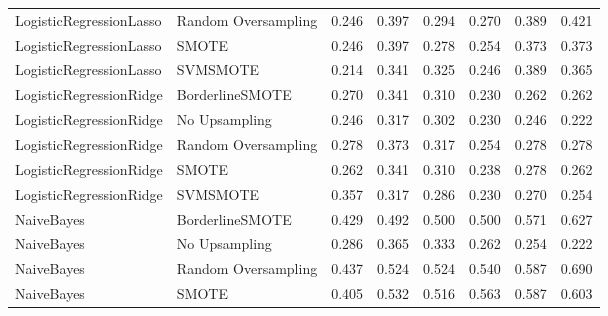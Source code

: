 \begin{tabular}{llllllll}
     LogisticRegressionLasso & Random Oversampling & 0.246 &                     0.397 &                 0.294 &                  0.270 &                                   0.389 &     0.421 \\
     LogisticRegressionLasso &               SMOTE & 0.246 &                     0.397 &                 0.278 &                  0.254 &                                   0.373 &     0.373 \\
     LogisticRegressionLasso &            SVMSMOTE & 0.214 &                     0.341 &                 0.325 &                  0.246 &                                   0.389 &     0.365 \\
     LogisticRegressionRidge &     BorderlineSMOTE & 0.270 &                     0.341 &                 0.310 &                  0.230 &                                   0.262 &     0.262 \\
     LogisticRegressionRidge &       No Upsampling & 0.246 &                     0.317 &                 0.302 &                  0.230 &                                   0.246 &     0.222 \\
     LogisticRegressionRidge & Random Oversampling & 0.278 &                     0.373 &                 0.317 &                  0.254 &                                   0.278 &     0.278 \\
     LogisticRegressionRidge &               SMOTE & 0.262 &                     0.341 &                 0.310 &                  0.238 &                                   0.278 &     0.262 \\
     LogisticRegressionRidge &            SVMSMOTE & 0.357 &                     0.317 &                 0.286 &                  0.230 &                                   0.270 &     0.254 \\
                  NaiveBayes &     BorderlineSMOTE & 0.429 &                     0.492 &                 0.500 &                  0.500 &                                   0.571 &     0.627 \\
                  NaiveBayes &       No Upsampling & 0.286 &                     0.365 &                 0.333 &                  0.262 &                                   0.254 &     0.222 \\
                  NaiveBayes & Random Oversampling & 0.437 &                     0.524 &                 0.524 &                  0.540 &                                   0.587 &     0.690 \\
                  NaiveBayes &               SMOTE & 0.405 &                     0.532 &                 0.516 &                  0.563 &                                   0.587 &     0.603 \\

\end{tabular}

